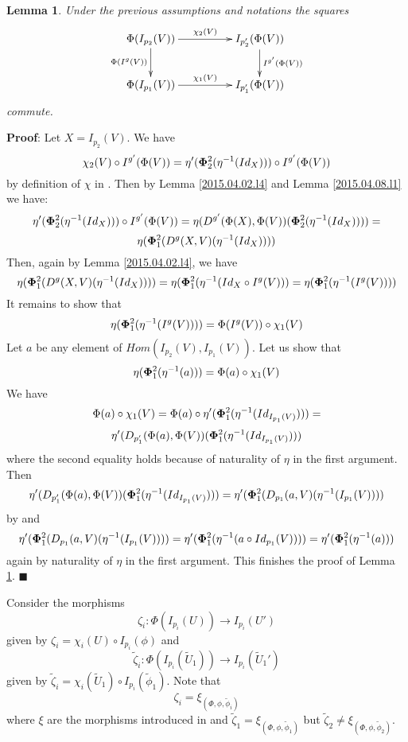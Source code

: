 \documentclass[12pt]{article}
\numberwithin{equation}{section}
\newenvironment{myproof}{{\bf Proof}:}{$\blacksquare$ \vskip 5mm }
\newtheorem{lemma}[proposition]{Lemma}
\newcommand{\llabel}[1]{\label{#1}}
\newcommand{\sr}{\rightarrow}
\newcommand{\wt}{\widetilde}
\begin{document}
%
\begin{lemma}
\llabel{2015.04.06.l7} Under the previous assumptions and notations the squares
%
$$
\begin{xy}
          \xymatrix@C=4pc{ \Phi(I_{p_2}(V)) \ar[r]^-{\chi_2(V)}
            \ar[d]_{\Phi(I^g(V))} & I_{p_2'}(\Phi(V))
            \ar[d]^{I^{g'}(\Phi(V))}\\ \Phi(I_{p_1}(V)) \ar[r]^{\chi_1(V)} &
            I_{p_1'}(\Phi(V)) }
\end{xy}
$$
%
commute.
\end{lemma}
%
\begin{myproof}
Let $X=I_{p_2}(V)$. We have
%
$$\chi_2(V)\circ {I^{g'}(\Phi(V))}=\eta'({\bf\Phi}_2^2(\eta^{-1}(Id_{X})))\circ
I^{g'}(\Phi(V))$$
%
by definition of $\chi$ in \cite[Construction 5.6]{fromunivwithPi}. Then by
Lemma \ref{2015.04.02.l4} and Lemma \ref{2015.04.08.l1} we have:
%
$$\eta'({\bf\Phi}_2^2(\eta^{-1}(Id_{X})))\circ
I^{g'}(\Phi(V))=\eta(D^{g'}(\Phi(X),\Phi(V))({\bf\Phi}_2^2(\eta^{-1}(Id_X))))=$$$$\eta({\bf\Phi}_1^2(D^g(X,V)(\eta^{-1}(Id_X))))$$
%
Then, again by Lemma \ref{2015.04.02.l4}, we have
%
$$\eta({\bf\Phi}_1^2(D^g(X,V)(\eta^{-1}(Id_X))))=\eta({\bf\Phi}_1^2(\eta^{-1}(Id_X\circ
I^g(V)))=\eta({\bf\Phi}_1^2(\eta^{-1}(I^g(V))))$$
%
It remains to show that
%
$$\eta({\bf\Phi}_1^2(\eta^{-1}(I^g(V))))=\Phi(I^g(V))\circ \chi_1(V)$$
%
Let $a$ be any element of $Hom(I_{p_2}(V),I_{p_1}(V))$. Let us show that
%
$$\eta({\bf\Phi}_1^2(\eta^{-1}(a)))=\Phi(a)\circ \chi_1(V)$$
%
We have
%
$$\Phi(a)\circ \chi_1(V)=\Phi(a)\circ
\eta'({\bf\Phi}^2_1(\eta^{-1}(Id_{I_{p_1}(V)})))=$$$$\eta'(D_{p_1'}(\Phi(a),\Phi(V))({\bf\Phi}^2_1(\eta^{-1}(Id_{I_{p_1}(V)})))$$
%
where the second equality holds because of naturality of $\eta$ in the first
argument. Then
%
$$\eta'(D_{p_1'}(\Phi(a),\Phi(V))({\bf\Phi}^2_1(\eta^{-1}(Id_{I_{p_1}(V)})))=\eta'({\bf\Phi}^2_1(D_{p_1}(a,V)(\eta^{-1}(I_{p_1}(V))))$$
%
by \cite[Lemma 5.4]{fromunivwithPi} and
%
$$\eta'({\bf\Phi}^2_1(D_{p_1}(a,V)(\eta^{-1}(I_{p_1}(V))))=\eta'({\bf\Phi}^2_1(\eta^{-1}(a\circ
Id_{p_1}(V))))=\eta'({\bf\Phi}_1^2(\eta^{-1}(a)))$$
%
again by naturality of $\eta$ in the first argument. This finishes the proof of
Lemma \ref{2015.04.06.l7}.
\end{myproof}




Consider the morphisms
%
$$\zeta_i:\Phi(I_{p_i}(U))\sr I_{p_i}(U')$$
%
given by $\zeta_i=\chi_i(U)\circ I_{p_i}(\phi)$ and
%
$$\wt{\zeta}_i:\Phi(I_{p_i}(\wt{U}_1))\sr I_{p_i}(\wt{U}_1')$$
%
given by $\wt{\zeta}_i=\chi_i(\wt{U}_1)\circ I_{p_i}(\wt{\phi}_1)$. Note that
%
$$\zeta_i=\xi_{(\Phi,\phi,\wt{\phi}_i)}$$
%
where $\xi$ are the morphisms introduced in \cite{fromunivwithPi} and
$\wt{\zeta}_1=\xi_{(\Phi,\phi,\wt{\phi}_1)}$ but $\wt{\zeta}_2\ne
\xi_{(\Phi,\phi,\wt{\phi}_2)}$.
\end{document}

